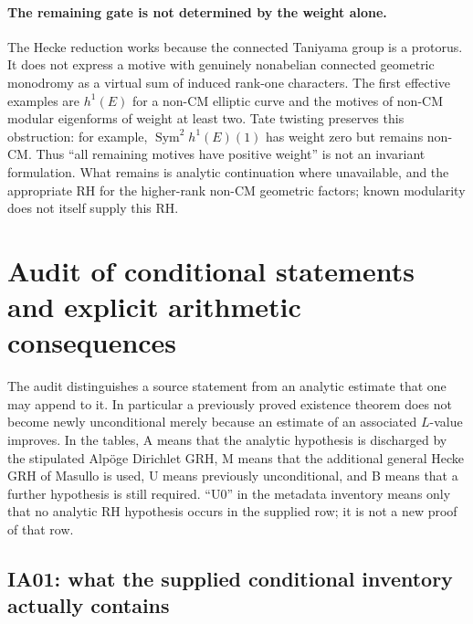 \documentclass[11pt,a4paper]{article}
\theoremstyle{definition}
\begin{document}
\paragraph{The remaining gate is not determined by the weight alone.}
The Hecke reduction works because the connected Taniyama group is a
protorus. It does not express a motive with genuinely nonabelian connected
geometric monodromy as a virtual sum of induced rank-one characters.
The first effective examples are $h^1(E)$ for a non-CM elliptic curve and
the motives of non-CM modular eigenforms of weight at least two.
Tate twisting preserves this obstruction: for example,
$\operatorname{Sym}^2h^1(E)(1)$ has weight zero but remains non-CM.
Thus ``all remaining motives have positive weight'' is not an invariant
formulation. What remains is analytic continuation where unavailable,
and the appropriate RH for the higher-rank non-CM geometric factors;
known modularity does not itself supply this RH.



\section{Audit of conditional statements and explicit arithmetic consequences}
\label{sec:intake-audit}

The audit distinguishes a source statement from an analytic estimate that one
may append to it.  In particular a previously proved existence theorem does
not become newly unconditional merely because an estimate of an associated
$L$-value improves.  In the tables, A means that the analytic hypothesis is
discharged by the stipulated Alp\"oge Dirichlet GRH, M means that the
additional general Hecke GRH of Masullo is used, U means previously
unconditional, and B means that a further hypothesis is still required.
``U0'' in the metadata inventory means only that no analytic RH hypothesis
occurs in the supplied row; it is not a new proof of that row.

\subsection{IA01: what the supplied conditional inventory actually contains}
\end{document}
